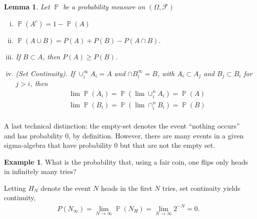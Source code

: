 \documentclass[12pt]{amsbook}
\newcommand{\filter}{\mathcal{F}}
\DeclareMathOperator{\prob}{\mathbb{P}}
\theoremstyle{plain}
\newtheorem{lemma}[theorem]{Lemma}
\theoremstyle{definition}
\newtheorem*{example}{Example}
\theoremstyle{remark}
\numberwithin{equation}{section}  %
\begin{document}
\begin{lemma}
	Let $\prob$ be a probability measure on $(\Omega, \filter)$
	\begin{enumerate}[(i)]
		\item $\prob(A^c) = 1 - \prob(A)$
		\item $\prob(A \cup B) = P(A) + P(B) - P(A \cap B)$.
		\item If $B \subset A$, then $P(A) \ge P(B)$.
		\item \emph{(Set Continuity)}.
			If $\cup_i^\infty A_i = A$ and
			$\cap B_i^\infty = B$, with $A_i \subset A_j$ and $B_j \subset B_i$ 
			for $j > i$,
			then
			\begin{align*}
				& \lim \prob(A_i) = \prob(\lim \cup_i^n A_i) = \prob(A) \\
				& \lim \prob(B_i) = \prob(\lim \cap_i^n B_i) = \prob(B) \\
			\end{align*}
	\end{enumerate}
\end{lemma}
A last technical distinction: the empty-set denotes the event ``nothing
occurs'' and has probability $0$, by definition. However, there are many
events in a given sigma-algebra that have probability $0$ but that are not the
empty set.

\begin{example}What is the probability that, using a fair coin, one
	flips only heads in infinitely many tries? 
\end{example}
Letting $H_N$ denote the event
$N$ heads in the first $N$ tries, set continuity yields
continuity,
\begin{align*}
	P(N_\infty) = \lim_{N \to \infty} \prob(N_H) = \lim_{N \to \infty} 2^{-N} = 
	0.
\end{align*}
\end{document}
